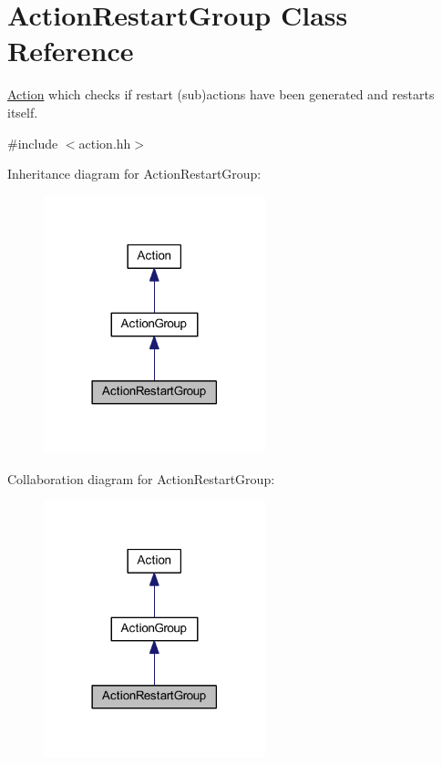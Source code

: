 \hypertarget{class_action_restart_group}{}\section{Action\+Restart\+Group Class Reference}
\label{class_action_restart_group}


\mbox{\hyperlink{class_action}{Action}} which checks if restart (sub)actions have been generated and restarts itself.  




{\ttfamily \#include $<$action.\+hh$>$}



Inheritance diagram for Action\+Restart\+Group\+:
\nopagebreak
\begin{figure}[H]
\begin{center}
\leavevmode
\includegraphics[width=182pt]{class_action_restart_group__inherit__graph}
\end{center}
\end{figure}


Collaboration diagram for Action\+Restart\+Group\+:
\nopagebreak
\begin{figure}[H]
\begin{center}
\leavevmode
\includegraphics[width=182pt]{class_action_restart_group__coll__graph}
\end{center}
\end{figure}
